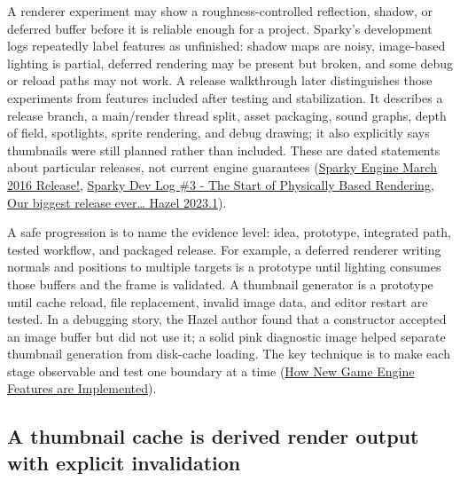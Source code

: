 \hypertarget{06-engine-ii-ch041-separate-a-working-prototype-from-a-shippable-feature}{}

A renderer experiment may show a roughness-controlled reflection, shadow, or deferred buffer before it is reliable enough for a project. Sparky's development logs repeatedly label features as unfinished: shadow maps are noisy, image-based lighting is partial, deferred rendering may be present but broken, and some debug or reload paths may not work. A release walkthrough later distinguishes those experiments from features included after testing and stabilization. It describes a release branch, a main/render thread split, asset packaging, sound graphs, depth of field, spotlights, sprite rendering, and debug drawing; it also explicitly says thumbnails were still planned rather than included. These are dated statements about particular releases, not current engine guarantees (\href{https://www.youtube.com/watch?v=o4_tPhgslcU&t=4m34s}{Sparky Engine March 2016 Release!}, \href{https://www.youtube.com/watch?v=YRd2F1JDGlg&t=0m8s}{Sparky Dev Log \#3 - The Start of Physically Based Rendering}, \href{https://www.youtube.com/watch?v=L_XLGmG2Ct8&t=0m1s}{Our biggest release ever\ldots{} Hazel 2023.1}).

A safe progression is to name the evidence level: idea, prototype, integrated path, tested workflow, and packaged release. For example, a deferred renderer writing normals and positions to multiple targets is a prototype until lighting consumes those buffers and the frame is validated. A thumbnail generator is a prototype until cache reload, file replacement, invalid image data, and editor restart are tested. In a debugging story, the Hazel author found that a constructor accepted an image buffer but did not use it; a solid pink diagnostic image helped separate thumbnail generation from disk-cache loading. The key technique is to make each stage observable and test one boundary at a time (\href{https://www.youtube.com/watch?v=z1O6AZWuWm4&t=13m56s}{How New Game Engine Features are Implemented}).

\subsection{A thumbnail cache is derived render output with explicit invalidation}\label{06-engine-ii-ch041-a-thumbnail-cache-is-derived-render-output-with-explicit-invalidation}

\hypertarget{06-engine-ii-ch041-a-thumbnail-cache-is-derived-render-output-with-explicit-invalidation}{}

